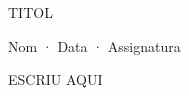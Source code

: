 \documentclass[12pt,a4paper]{article}
\newcommand{\Title}[1]{\begin{center}\begin{LARGE}#1\vspace{8pt}\end{LARGE}\end{center}}
\newcommand{\SubTitle}[1]{\begin{center}#1\vspace{20pt}\end{center}}
\begin{document}
\Title{TITOL}
\SubTitle{Nom · Data · Assignatura}

ESCRIU AQUI
\end{document}
